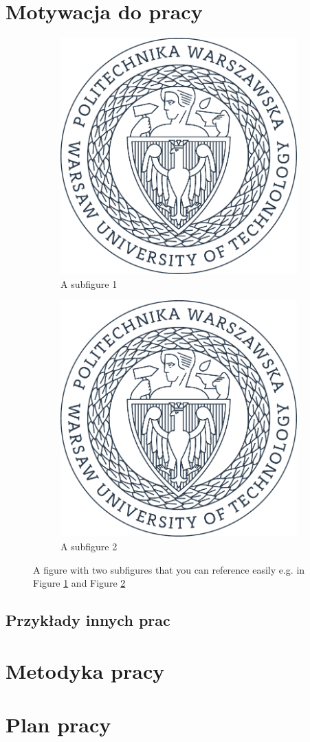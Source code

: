 \section{Motywacja do pracy}
\lipsum[1]

\begin{figure}[h]
	\centering
	\begin{subfigure}{.5\textwidth}
		\centering
		\includegraphics[width=.6\textwidth]{img/PW_logo}
		\caption{A subfigure 1}
		\label{fig:sub1}
	\end{subfigure}%
	\begin{subfigure}{.5\textwidth}
		\centering
		\includegraphics[width=.6\textwidth]{img/PW_logo}
		\caption{A subfigure 2}
		\label{fig:sub2}
	\end{subfigure}
	\caption{A figure with two subfigures that you can reference easily e.g. in Figure \ref{fig:sub1} and Figure \ref{fig:sub2}}
	\label{fig:test}
\end{figure}

\lipsum[2]


\lipsum[5]

\subsection{Przykłady innych prac}
\lipsum[1-3]

\section{Metodyka pracy}
\lipsum[2-4]

\section{Plan pracy}
\lipsum[1]